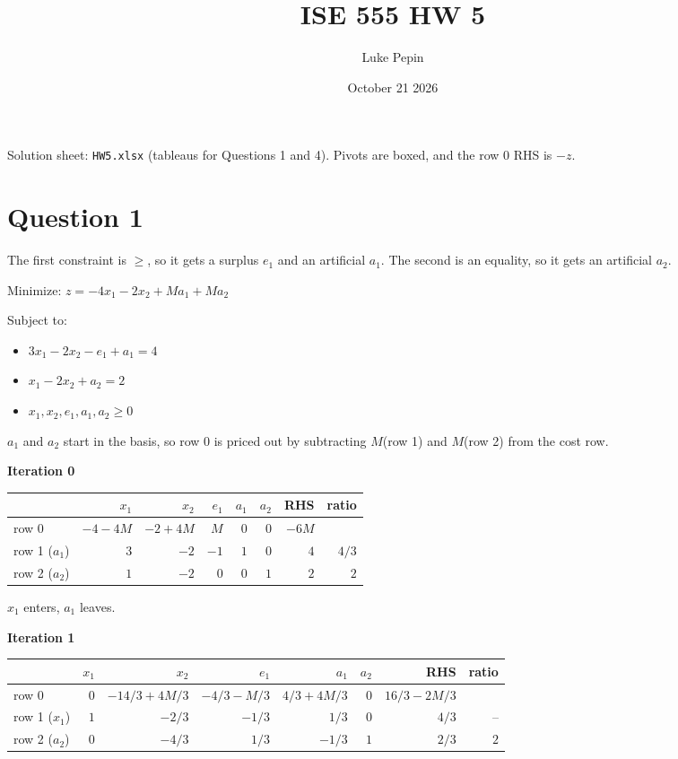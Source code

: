 \documentclass{article}
\title{ISE 555 HW 5}
\author{Luke Pepin}
\date{October 21 2026}
\begin{document}
\maketitle

Solution sheet: \texttt{HW5.xlsx} (tableaus for Questions 1 and 4). Pivots are boxed, and the row 0 RHS is $-z$.

\section*{Question 1}
The first constraint is $\ge$, so it gets a surplus $e_1$ and an artificial $a_1$. The second is an equality, so it gets an artificial $a_2$.

Minimize: $z = -4x_1 - 2x_2 + Ma_1 + Ma_2$

Subject to:
\begin{itemize}
    \item $3x_1 - 2x_2 - e_1 + a_1 = 4$
    \item $x_1 - 2x_2 + a_2 = 2$
    \item $x_1, x_2, e_1, a_1, a_2 \ge 0$
\end{itemize}

$a_1$ and $a_2$ start in the basis, so row 0 is priced out by subtracting $M$(row 1) and $M$(row 2) from the cost row.

\textbf{Iteration 0}

\begin{center}
\begin{tabular}{lrrrrrrr}
\toprule
 & $x_1$ & $x_2$ & $e_1$ & $a_1$ & $a_2$ & RHS & ratio \\
\midrule
row 0 & $-4-4M$ & $-2+4M$ & $M$ & $0$ & $0$ & $-6M$ &  \\
row 1 ($a_1$) & $\boxed{3}$ & $-2$ & $-1$ & $1$ & $0$ & $4$ & $4/3$ \\
row 2 ($a_2$) & $1$ & $-2$ & $0$ & $0$ & $1$ & $2$ & $2$ \\
\bottomrule
\end{tabular}
\end{center}

$x_1$ enters, $a_1$ leaves.

\textbf{Iteration 1}

\begin{center}
\begin{tabular}{lrrrrrrr}
\toprule
 & $x_1$ & $x_2$ & $e_1$ & $a_1$ & $a_2$ & RHS & ratio \\
\midrule
row 0 & $0$ & $-14/3+4M/3$ & $-4/3-M/3$ & $4/3+4M/3$ & $0$ & $16/3-2M/3$ &  \\
row 1 ($x_1$) & $1$ & $-2/3$ & $-1/3$ & $1/3$ & $0$ & $4/3$ & -- \\
row 2 ($a_2$) & $0$ & $-4/3$ & $\boxed{1/3}$ & $-1/3$ & $1$ & $2/3$ & $2$ \\
\bottomrule
\end{tabular}
\end{center}
\end{document}
